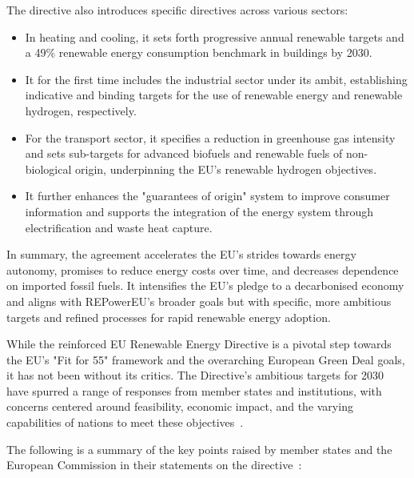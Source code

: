 The directive also introduces specific directives across various sectors:

\begin{itemize}
    \item In heating and cooling, it sets forth progressive annual renewable targets and a 49\% renewable energy consumption benchmark in buildings by 2030.
    \item It for the first time includes the industrial sector under its ambit, establishing indicative and binding targets for the use of renewable energy and renewable hydrogen, respectively.
    \item For the transport sector, it specifies a reduction in greenhouse gas intensity and sets sub-targets for advanced biofuels and renewable fuels of non-biological origin, underpinning the EU's renewable hydrogen objectives.
    \item It further enhances the "guarantees of origin" system to improve consumer information and supports the integration of the energy system through electrification and waste heat capture.
\end{itemize}

In summary, the agreement accelerates the EU's strides towards energy autonomy, promises to reduce energy costs over time, and decreases dependence on imported fossil fuels. It intensifies the EU's pledge to a decarbonised economy and aligns with REPowerEU's broader goals but with specific, more ambitious targets and refined processes for rapid renewable energy adoption.

While the reinforced EU Renewable Energy Directive is a pivotal step towards the EU's "Fit for 55" framework and the overarching European Green Deal goals, it has not been without its critics. The Directive's ambitious targets for 2030 have spurred a range of responses from member states and institutions, with concerns centered around feasibility, economic impact, and the varying capabilities of nations to meet these objectives~\cite{eu2023energycritique}.

The following is a summary of the key points raised by member states and the European Commission in their statements on the directive~\cite{eu2023energycritique}:

